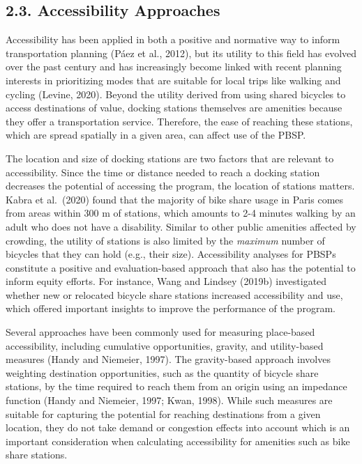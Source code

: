 \documentclass[]{elsarticle} %
\begin{document}
\hypertarget{accessibility-approaches}{%
\subsection{2.3. Accessibility
Approaches}\label{accessibility-approaches}}

Accessibility has been applied in both a positive and normative way to
inform transportation planning (Páez et al., 2012), but its utility to
this field has evolved over the past century and has increasingly become
linked with recent planning interests in prioritizing modes that are
suitable for local trips like walking and cycling (Levine, 2020). Beyond
the utility derived from using shared bicycles to access destinations of
value, docking stations themselves are amenities because they offer a
transportation service. Therefore, the ease of reaching these stations,
which are spread spatially in a given area, can affect use of the PBSP.

The location and size of docking stations are two factors that are
relevant to accessibility. Since the time or distance needed to reach a
docking station decreases the potential of accessing the program, the
location of stations matters. Kabra et al.~(2020) found that the
majority of bike share usage in Paris comes from areas within 300 m of
stations, which amounts to 2-4 minutes walking by an adult who does not
have a disability. Similar to other public amenities affected by
crowding, the utility of stations is also limited by the \emph{maximum}
number of bicycles that they can hold (e.g., their size). Accessibility
analyses for PBSPs constitute a positive and evaluation-based approach
that also has the potential to inform equity efforts. For instance, Wang
and Lindsey (2019b) investigated whether new or relocated bicycle share
stations increased accessibility and use, which offered important
insights to improve the performance of the program.

Several approaches have been commonly used for measuring place-based
accessibility, including cumulative opportunities, gravity, and
utility-based measures (Handy and Niemeier, 1997). The gravity-based
approach involves weighting destination opportunities, such as the
quantity of bicycle share stations, by the time required to reach them
from an origin using an impedance function (Handy and Niemeier, 1997;
Kwan, 1998). While such measures are suitable for capturing the
potential for reaching destinations from a given location, they do not
take demand or congestion effects into account which is an important
consideration when calculating accessibility for amenities such as bike
share stations.
\end{document}

